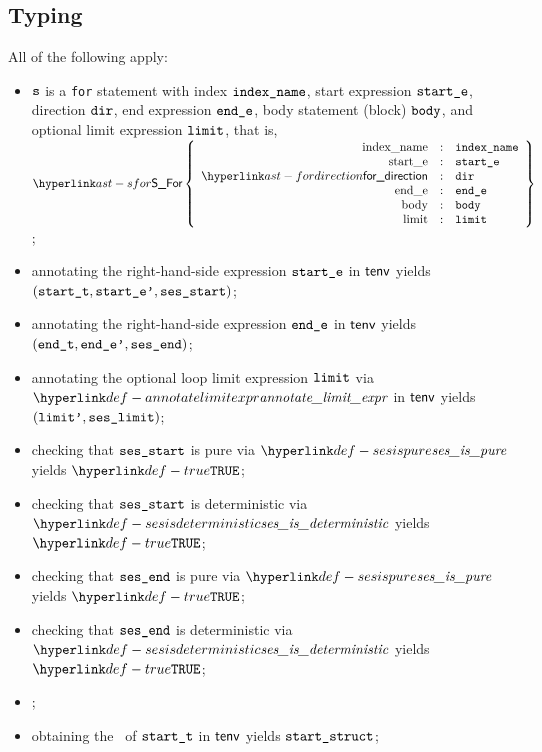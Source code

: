 \subsection{Typing}
\ProseParagraph
All of the following apply:
\begin{itemize}
  \item $\texttt{s}$ is a \texttt{for} statement with index $\texttt{index\_name}$,
        start expression $\texttt{start\_e}$,
        direction $\texttt{dir}$,
        end expression $\texttt{end\_e}$,
        body statement (block) $\texttt{body}$,
        and optional limit expression $\texttt{limit}$,
        that is, $\SFor\left\{\begin{array}{rcl}
          \Forindexname &:& \vindexname\\
          \Forstarte &:& \vstarte\\
          \fordirection &:& \vdir\\
          \Forende &:& \vende\\
          \Forbody &:& \vbody\\
          \Forlimit &:& \vlimit
        \end{array}\right\}$;
  \item annotating the right-hand-side expression $\texttt{start\_e}$ in $\textsf{tenv}$ yields \\
        $(\texttt{start\_t}, \texttt{start\_e'}, \texttt{ses\_start})$\ProseOrTypeError;
  \item annotating the right-hand-side expression $\texttt{end\_e}$ in $\textsf{tenv}$ yields \\ $(\texttt{end\_t}, \texttt{end\_e'}, \texttt{ses\_end})$\ProseOrTypeError;
  \item annotating the optional loop limit expression $\texttt{limit}$ via $\annotatelimitexpr$ in $\textsf{tenv}$
        yields $(\texttt{limit'}, \texttt{ses\_limit})$\ProseOrTypeError;
  \item checking that $\texttt{ses\_start}$ is pure via $\sesispure$ yields $\True$\ProseOrTypeError;
  \item checking that $\texttt{ses\_start}$ is deterministic via $\sesisdeterministic$ yields $\True$\ProseOrTypeError;
  \item checking that $\texttt{ses\_end}$ is pure via $\sesispure$ yields $\True$\ProseOrTypeError;
  \item checking that $\texttt{ses\_end}$ is deterministic via $\sesisdeterministic$ yields $\True$\ProseOrTypeError;
  \item {};
  \item obtaining the \underlyingtype\ of $\texttt{start\_t}$ in $\textsf{tenv}$ yields $\texttt{start\_struct}$\ProseOrTypeError;

\end{itemize}
